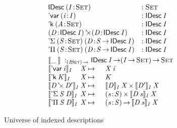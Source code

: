 
\begin{figure}

\[\stk{\begin{array}{@{}ll}
\IDesc{(\Bhab{\V{I}}{\Set})} &: \Set \\
\DVar{(\Bhab{\V{i}}{\V{I}})} &: \IDesc{\V{I}} \\
\DConst{(\Bhab{\V{A}}{\Set})} &:\IDesc{\V{I}}       \\
\DProd{(\Bhab{\V{D}}{\IDesc{\V{I}}})}{(\Bhab{\V{D}}{\IDesc{\V{I}}})}
  & :\IDesc{\V{I}}       \\
\DSigma{(\Bhab{\V{S}}{\Set})}{(\Bhab{\V{D}}{\V{S}\To\IDesc{\V{I}}})}
& : \IDesc{\V{I}}  \\
\DPi{(\Bhab{\V{S}}{\Set})}{(\Bhab{\V{D}}{\V{S}\To\IDesc{\V{I}}})}
& : \IDesc{\V{I}}  \\
\end{array}\smallskip \\
\idescop{\_\:}{}{} :_{\PI{\V{I}}{\Set}} \IDesc{\V{I}} \To (\V{\V{I}} \To \Set) \To \Set                  \\
\begin{array}{@{}l@{\V{X}}@{\:\mapsto\:\:}ll}
\idescop{\DVar{\V{i}}}{\V{I}}{&}      &  \V{X}\: \V{i}                                           \\
\idescop{\DConst{\V{K}}}{\V{I}}{&}    &  \V{K}                                                   \\
\idescop{\DProd{\V{D}}{\V{D'}}}{\V{I}}{&} &  \TIMES{\idescop{\V{D}}{\V{I}}{\V{X}}}{\idescop{\V{D'}}{\V{I}}{\V{X}}}       \\
\idescop{\DSigma{\V{S}}{\V{D}}}{\V{I}}{&} &  \SIGMA{\V{s}}{\V{S}} \idescop{\V{D}\: \V{s}}{\V{I}}{\V{X}}                    \\
\idescop{\DPi{\V{S}}{\V{D}}}{\V{I}}{&}    &  \PI{\V{s}}{\V{S}} \idescop{\V{D}\: \V{s}}{\V{I}}{\V{X}}            
\end{array}
}
\]

\caption{Universe of indexed descriptions}
\label{fig:idesc}

\end{figure}

